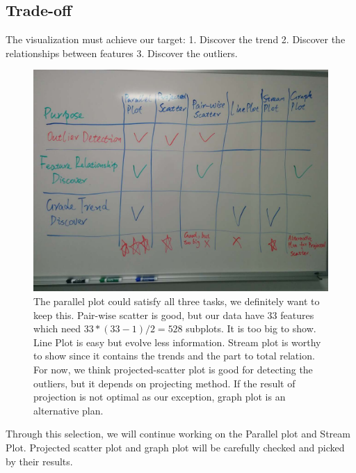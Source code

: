 \documentclass{article}
\begin{document}
\subsection{Trade-off}
The visualization must achieve our target: 1. Discover the trend 2. Discover the relationships between features 3. Discover the outliers.
\begin{figure}[H]
\centering
\includegraphics[scale=0.3]{compare.jpg}
\caption{The parallel plot could satisfy all three tasks, we definitely want to keep this. Pair-wise scatter is good, but our data have 33 features which need $33*(33-1)/2 = 528$ subplots. It is too big to show. Line Plot is easy but evolve less information. Stream plot is worthy to show since it contains the trends and the part to total relation. For now, we think projected-scatter plot is good for detecting the outliers, but it depends on projecting method. If the result of projection is not optimal as our exception, graph plot is an alternative plan.}
\end{figure}
Through this selection, we will continue working on the Parallel plot and Stream Plot. Projected scatter plot and graph plot will be carefully checked and picked by their results. 
\end{document}
